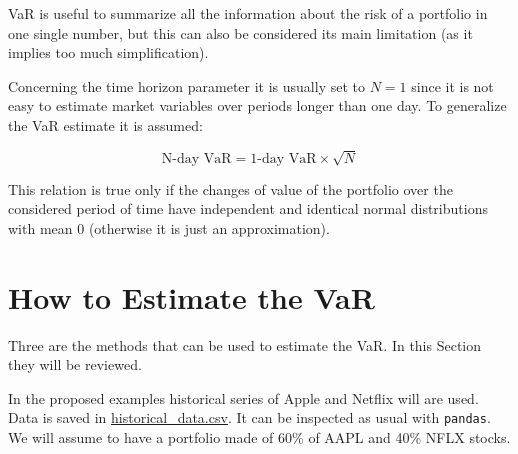 VaR is useful to summarize all the information about the risk of a
portfolio in one single number, but this can also be considered its main
limitation (as it implies too much simplification).

Concerning the time horizon parameter it is usually set to \(N=1\) since
it is not easy to estimate market variables over periods longer than one
day. To generalize the VaR estimate it is assumed:

\begin{equation}
\textrm{N-day VaR} = \textrm{1-day VaR}\times \sqrt{N}
\label{eq:var_horizon}
\end{equation}

This relation is true only if the changes of value of the portfolio over
the considered period of time have independent and identical normal
distributions with mean 0 (otherwise it is just an approximation).

\section{How to Estimate the VaR}\label{how-to-estimate-the-var}

Three are the methods that can be used to estimate the VaR.
In this Section they will be reviewed.

In the proposed examples historical series of Apple and Netflix will 
are used. Data is saved in \href{}{historical\_data.csv}.
It can be inspected as usual with \texttt{pandas}.
We will assume to have a portfolio made of 60\% of AAPL and 40\% NFLX stocks.

